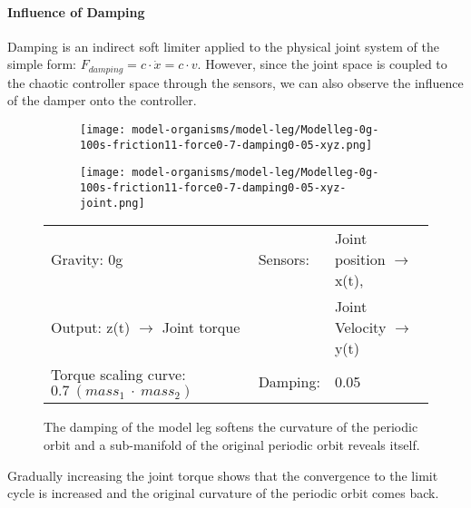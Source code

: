 \documentclass[main]{subfiles}
\begin{document}
\paragraph{Influence of Damping} Damping is an indirect soft limiter applied to the physical joint system of the simple form: \(F_{damping} = c \cdot \dot{x} = c \cdot v\). %
%
However, since the joint space is coupled to the chaotic controller space through the sensors, we can also observe the influence of the damper onto the controller.

\begin{figure}[H]
	\centering
		\begin{subfigure}[c]{0.45\textwidth}
	\texttt{[image: model-organisms/model-leg/Modelleg-0g-100s-friction11-force0-7-damping0-05-xyz.png]}
		\end{subfigure}
	\begin{subfigure}[c]{0.45\textwidth}
	\texttt{[image: model-organisms/model-leg/Modelleg-0g-100s-friction11-force0-7-damping0-05-xyz-joint.png]}
		\end{subfigure}
	\caption[Damped, limited chaotic controller controlling model leg]{The damping of the model leg softens the curvature of the periodic orbit and a sub-manifold of the original periodic orbit reveals itself.}
	\begin{tabular}{l|ll}
	\hline 
	Gravity: 0g  & Sensors: & Joint position \(\rightarrow\) x(t),\\
	 Output: z(t) \(\rightarrow\) Joint torque & & Joint Velocity \(\rightarrow\) y(t) \\
	  Torque scaling curve: \(0.7~(mass_1~\cdot~mass_2)\) & Damping: & 0.05 \\
	  \hline
	\end{tabular}

	\label{figure:limited-damped-model-leg-damping1}
\end{figure}

Gradually increasing the joint torque shows that the convergence to the limit cycle is increased and the original curvature of the periodic orbit comes back.
\end{document}
